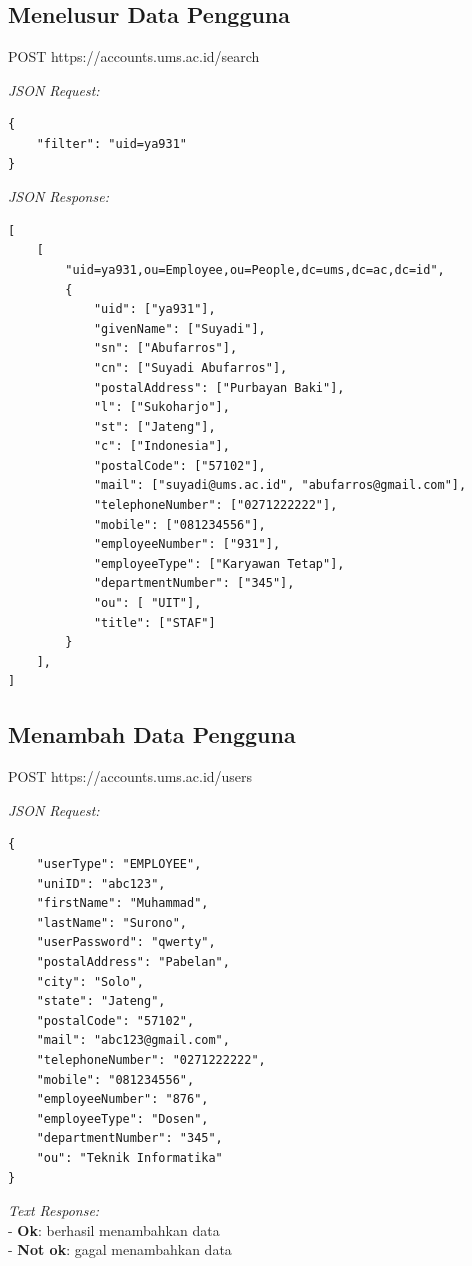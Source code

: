 \subsection{Menelusur Data Pengguna}

POST https://accounts.ums.ac.id/search

\noindent
\textit{JSON Request:}
\begin{lstlisting}
{
    "filter": "uid=ya931"
}
\end{lstlisting}

\noindent
\textit{JSON Response:}
\begin{lstlisting}
[
    [
        "uid=ya931,ou=Employee,ou=People,dc=ums,dc=ac,dc=id",
        {
            "uid": ["ya931"],
            "givenName": ["Suyadi"],
            "sn": ["Abufarros"],
            "cn": ["Suyadi Abufarros"],
            "postalAddress": ["Purbayan Baki"],
            "l": ["Sukoharjo"],
            "st": ["Jateng"],
            "c": ["Indonesia"],
            "postalCode": ["57102"],
            "mail": ["suyadi@ums.ac.id", "abufarros@gmail.com"],
            "telephoneNumber": ["0271222222"],
            "mobile": ["081234556"],
            "employeeNumber": ["931"],
            "employeeType": ["Karyawan Tetap"],
            "departmentNumber": ["345"],
            "ou": [ "UIT"],
            "title": ["STAF"]
        }
    ],
]
\end{lstlisting}

\subsection{Menambah Data Pengguna}

POST https://accounts.ums.ac.id/users

\noindent
\textit{JSON Request:}
\begin{lstlisting}
{
    "userType": "EMPLOYEE",
    "uniID": "abc123",
    "firstName": "Muhammad",
    "lastName": "Surono",
    "userPassword": "qwerty",
    "postalAddress": "Pabelan",
    "city": "Solo",
    "state": "Jateng",
    "postalCode": "57102",
    "mail": "abc123@gmail.com",
    "telephoneNumber": "0271222222",
    "mobile": "081234556",
    "employeeNumber": "876",
    "employeeType": "Dosen",
    "departmentNumber": "345",
    "ou": "Teknik Informatika"
}
\end{lstlisting}

\noindent
\textit{Text Response:}\\
- \textbf{Ok}: berhasil menambahkan data\\
-  \textbf{Not ok}: gagal menambahkan data

